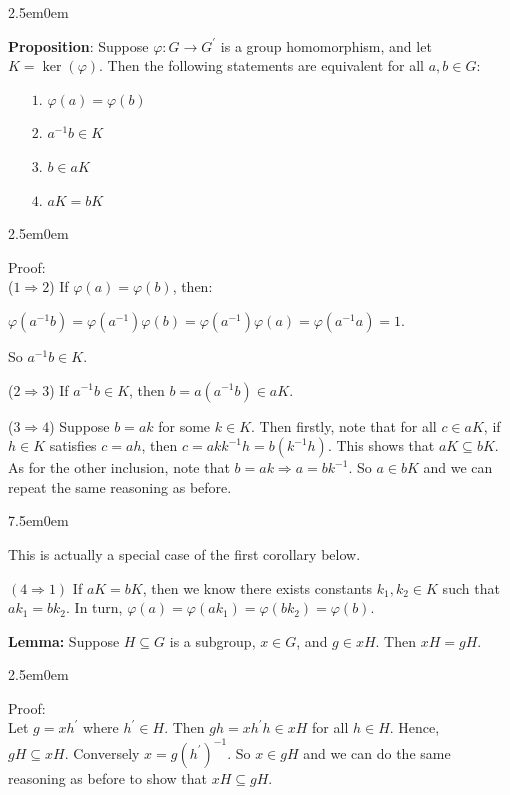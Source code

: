 \documentclass{book}
\newcommand{\hTwo}{%
\color{MidnightBlue}%
   \fontsize{13}{15}\selectfont%
}
\newcommand{\hThree}{%
   \color{PineGreen!85!Orange}
   \fontsize{12}{14}\selectfont%
}
\newcommand{\teachComment}{
   \color{Orange}%
   \fontsize{12}{14}\selectfont%
}
\newenvironment{myIndent}{%
   \begin{adjustwidth}{2.5em}{0em}%
}{%
   \end{adjustwidth}%
}
\newenvironment{myTindent}{%
   \begin{adjustwidth}{7.5em}{0em}%
}{%
   \end{adjustwidth}%
}
\newcommand{\blab}[1]{\textbf{#1}}
\newcommand{\retTwo}{\hfill\bigbreak}
\begin{document}
\begin{myIndent}\hTwo
	\blab{Proposition}: Suppose $\varphi: G \longrightarrow G^\prime$ is a group homomorphism, and let\\ $K = \ker(\varphi)$. Then the following statements are equivalent for all $a, b \in G$:
	\begin{itemize}
		\item[$1$.] $\varphi(a) = \varphi(b)$
		\item[$2$.] $a^{-1}b \in K$
		\item[$3$.] $b \in aK$
		\item[$4$.] $aK = bK$
	\end{itemize}

	\begin{myIndent}\hThree
		Proof:\\
		($1 \Longrightarrow 2$) If $\varphi(a) = \varphi(b)$, then:

		{\centering $\varphi(a^{-1}b) = \varphi(a^{-1})\varphi(b) = \varphi(a^{-1})\varphi(a) = \varphi(a^{-1}a) = 1$.\retTwo\par}
		
		So $a^{-1}b \in K$.\retTwo

		($2 \Longrightarrow 3$) If $a^{-1}b \in K$, then $b = a(a^{-1}b) \in aK$.\retTwo

		($3 \Longrightarrow 4$) Suppose $b = ak$ for some $k \in K$. Then firstly, note that for all $c \in aK$, if $h \in K$ satisfies $c = ah$, then $c = akk^{-1}h = b(k^{-1}h)$. This shows that $aK \subseteq bK$. As for the other inclusion, note that $b = ak \Longrightarrow a = bk^{-1}$. So $a \in bK$ and we can repeat the same reasoning as before.
		
		\begin{myTindent}\teachComment
			This is actually a special case of the first corollary below.\retTwo
		\end{myTindent}

		$(4 \Longrightarrow 1)$ If $aK = bK$, then we know there exists constants $k_1, k_2 \in K$ such that $ak_1 = bk_2$. In turn, $\varphi(a) = \varphi(ak_1) = \varphi(bk_2) = \varphi(b)$.\retTwo
	\end{myIndent}

	\blab{Lemma:} Suppose $H \subseteq G$ is a subgroup, $x \in G$, and $g \in xH$. Then $xH = gH$.

	\begin{myIndent}\hThree
		Proof:\\
		Let $g = xh^\prime$ where $h^\prime \in H$. Then $gh = xh^\prime h \in xH$ for all $h \in H$. Hence,\\ $gH \subseteq xH$. Conversely $x = g(h^\prime)^{-1}$. So $x \in gH$ and we can do the same\\ reasoning as before to show that $xH \subseteq gH$.\retTwo
	\end{myIndent}


\end{myIndent}
\end{document}
